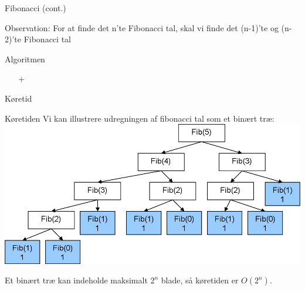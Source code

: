 \documentclass[12pt,t]{beamer}
\begin{document}
    \begin{frame}{Fibonacci (cont.)}
    \begin{block}{Observation:}
    For at finde det n'te Fibonacci tal, skal vi finde det (n-1)'te og (n-2)'te 
    Fibonacci tal
    \end{block}
    \pause
        \begin{block}{Algoritmen}
        \vspace{-1.5em}
        \begin{algorithm}[H]
            \caption{\newline Input: Et tal, n
                     \newline Ouput: Det n'te Fibonacci tal
            }
            \begin{algorithmic}
                        ~
                    \Else
                        ~\Return {} + 
                    \EndIf
                \EndFunction
            \end{algorithmic}
        \end{algorithm}
        \end{block}
    \end{frame}

    \begin{frame}{Køretid}
        \begin{block}{Køretiden}
            Vi kan illustrere udregningen af fibonacci tal som et binært træ:
            \pause
            {\center
            \includegraphics[scale=0.5]{include/fib.png}
            }
            \pause

            Et binært træ kan indeholde maksimalt $2^n$ blade, så køretiden er $O(2^n)$.
        \end{block}
    \end{frame}
\end{document}
